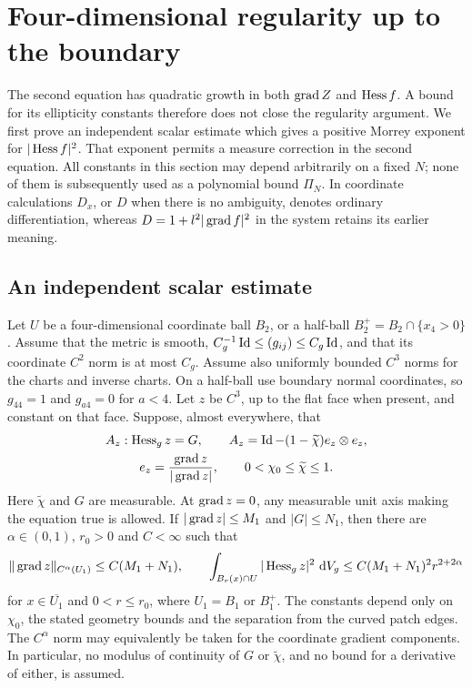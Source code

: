 \section{Four-dimensional regularity up to the boundary}\label{four:sec:regularity}

The second equation has quadratic growth in both $\operatorname{grad} Z$ and
$\operatorname{Hess} f$.  A bound for its ellipticity constants therefore does not
close the regularity argument.  We first prove an independent scalar
estimate which gives a positive Morrey exponent for $|\operatorname{Hess} f|^2$.
That exponent permits a measure correction in the second equation.
All constants in this section may depend arbitrarily on a fixed $N$;
none of them is subsequently used as a polynomial bound $\Pi_N$.
In coordinate calculations $D_x$, or $D$ when there is no ambiguity,
denotes ordinary differentiation, whereas $D=1+l^2|\operatorname{grad} f|^2$ in
the system retains its earlier meaning.

\subsection{An independent scalar estimate}

\begin{theorem}\label{four:thm:axial-regularity}
Let $U$ be a four-dimensional coordinate ball $B_2$, or a half-ball
$B_2^+=B_2\cap\{x_4>0\}$.  Assume that the metric is smooth,
$C_g^{-1}\operatorname{Id}\le (g_{ij})\le C_g\operatorname{Id}$, and that its coordinate
$C^2$ norm is at most $C_g$.  Assume also uniformly bounded $C^3$
norms for the charts and inverse charts.  On a half-ball use boundary
normal coordinates, so $g_{44}=1$ and $g_{a4}=0$ for $a<4$.
Let $z$ be $C^3$, up to the flat face when present, and constant on
that face.  Suppose, almost everywhere, that
\begin{equation}\label{four:reg:axial-equation}
 \begin{gathered}
 A_z:\operatorname{Hess}_g z=G,\qquad
 A_z=\operatorname{Id}-(1-\widetilde\chi)e_z\otimes e_z,\\
 e_z=\frac{\operatorname{grad} z}{|\operatorname{grad} z|},\qquad
 0<\chi_0\le\widetilde\chi\le1.
 \end{gathered}
\end{equation}
Here $\widetilde\chi$ and $G$ are measurable.  At $\operatorname{grad} z=0$,
any measurable unit axis making the equation true is allowed.
If $|\operatorname{grad} z|\le M_1$ and $|G|\le N_1$, then there are
$\alpha\in(0,1)$, $r_0>0$ and $C<\infty$ such that
\begin{equation}\label{four:eq:axial-estimate}
 \|\operatorname{grad} z\|_{C^\alpha(U_1)}\le C(M_1+N_1),\qquad
 \int_{B_r(x)\cap U}|\operatorname{Hess}_g z|^2\,\,\mathrm d V_g
       \le C(M_1+N_1)^2r^{2+2\alpha}
\end{equation}
for $x\in\overline{U_1}$ and $0<r\le r_0$, where $U_1=B_1$
or $B_1^+$.  The constants depend only on $\chi_0$, the stated
geometry bounds and the separation from the curved patch edges.
The $C^\alpha$ norm may equivalently be taken for the coordinate
gradient components.  In particular, no modulus of continuity of
$G$ or $\widetilde\chi$, and no bound for a derivative of either,
is assumed.
\end{theorem}

